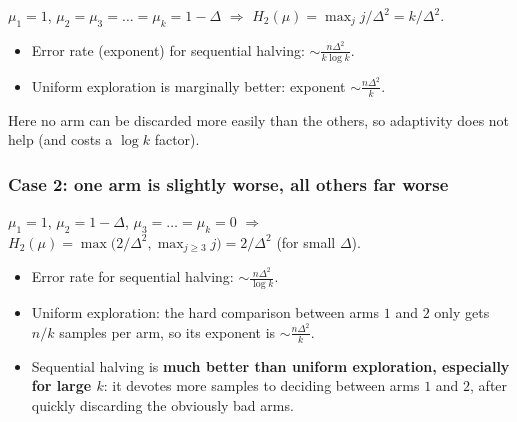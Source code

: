 $\mu_1 = 1$, $\mu_2 = \mu_3 = \dots = \mu_k = 1 - \Delta$ $\Rightarrow$ $H_2(\mu) = \max_j j/\Delta^2 = k/\Delta^2$.
\begin{itemize}
    \item Error rate (exponent) for sequential halving: $\sim \frac{n\Delta^2}{k\log k}$.
    \item Uniform exploration is marginally better: exponent $\sim \frac{n\Delta^2}{k}$.
\end{itemize}
Here no arm can be discarded more easily than the others, so adaptivity does not help (and costs a $\log k$ factor).

\subsubsection*{Case 2: one arm is slightly worse, all others far worse}

$\mu_1 = 1$, $\mu_2 = 1 - \Delta$, $\mu_3 = \dots = \mu_k = 0$ $\Rightarrow$ $H_2(\mu) = \max\big(2/\Delta^2, \max_{j\geq 3} j\big) = 2/\Delta^2$ (for small $\Delta$).
\begin{itemize}
    \item Error rate for sequential halving: $\sim \frac{n\Delta^2}{\log k}$.
    \item Uniform exploration: the hard comparison between arms $1$ and $2$ only gets $n/k$ samples per arm, so its exponent is $\sim \frac{n\Delta^2}{k}$.
    \item Sequential halving is \textbf{much better than uniform exploration, especially for large $k$}: it devotes more samples to deciding between arms $1$ and $2$, after quickly discarding the obviously bad arms.
\end{itemize}
